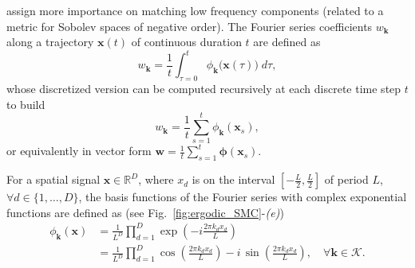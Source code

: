 \documentclass[10pt,a4paper]{article} %
\begin{document}
assign more importance on matching low frequency components (related to a metric for Sobolev spaces of negative order). %
The Fourier series coefficients $w_{\bm{k}}$ along a trajectory $\bm{x}(t)$ of continuous duration $t$ are defined as
\begin{equation}
	w_{\bm{k}} = \frac{1}{t} \int_{\tau=0}^t \phi_{\bm{k}}\big(\bm{x}(\tau)\big) \; d\tau,
	\label{eq:ck}
\end{equation}
whose discretized version can be computed recursively at each discrete time step $t$ to build
\begin{equation}
	w_{\bm{k}} = \frac{1}{t} \sum_{s=1}^t \phi_{\bm{k}}(\bm{x}_s), 
\end{equation}
or equivalently in vector form $\bm{w} = \frac{1}{t}\sum_{s=1}^t\bm{\phi}(\bm{x}_s)$. 

For a spatial signal $\bm{x}\in\mathbb{R}^D$, where $x_d$ is on the interval $[-\frac{L}{2},\frac{L}{2}]$ of period $L$, $\forall d\!\in\!\{1,\ldots,D\}$, the basis functions of the Fourier series with complex exponential functions are defined as (see Fig.~\ref{fig:ergodic_SMC}-\emph{(e)})
\begin{align}
	\phi_{\bm{k}}(\bm{x}) &= \frac{1}{L^D} \prod_{d=1}^D \exp\!\left(-i\frac{2\pi k_d x_d}{L}\right)\nonumber\\
	&= \frac{1}{L^D} \prod_{d=1}^D \cos\!\left(\frac{2\pi k_d x_d}{L}\right) - i \, \sin\!\left(\frac{2\pi k_d x_d}{L}\right)
	, \quad\forall\bm{k}\!\in\!\mathcal{K}.
	\label{eq:complExpND}
\end{align}
\end{document}
